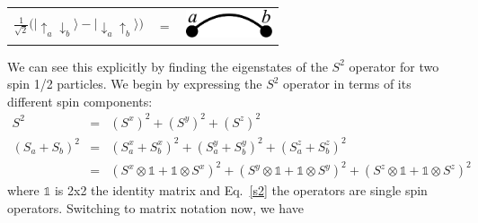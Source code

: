 \begin{center}
\begin{tabular}{ccc}
$  \frac{1}{\sqrt{2}}\big( \lvert \uparrow_a \downarrow_b \rangle - \lvert \downarrow_a \uparrow_b \rangle \big) $ & $= $
&
\includegraphics [width=1in]
{./figures/made/bond2.pdf}
\end{tabular}
\end{center}

We can see this explicitly by finding the eigenstates of the $S^2$ operator for 
two spin 1/2 particles.  We begin by expressing the $S^2$ operator in terms of its different
spin components:
\begin{eqnarray}
S^2 &=& (S^x)^2 + (S^y)^2 + (S^z)^2 \\
(S_a + S_b)^2 &=& (S^x_a+S^x_b)^2 + (S^y_a+S^y_b)^2 + (S^z_a+S^z_b)^2 \nonumber \\
			&=&(S^x\otimes \mathds{1}+\mathds{1} \otimes S^x)^2 + 
			(S^y\otimes \mathds{1}+\mathds{1}\otimes S^y)^2 + (S^z\otimes\mathds{1}+\mathds{1}\otimes S^z)^2
			\label{s2}
\end{eqnarray}
where $\mathds{1}$ is 2x2 the identity matrix and Eq.~\eqref{s2} the operators are single spin operators.
Switching to matrix notation now, we have
